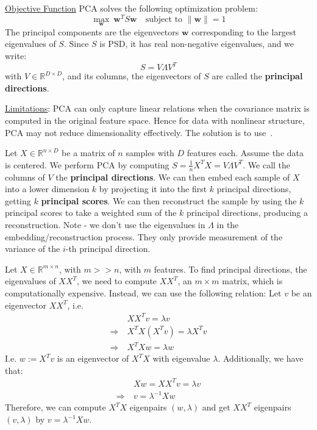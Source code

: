 \documentclass{article}
\begin{document}
\ul{Objective Function} PCA solves the following optimization problem:
\[
  \max_{\bm{w}} \ \bm{w}^{T} S \bm{w} \quad \text{subject to } \lVert \bm{w} \rVert =1
\]
The principal components are the eigenvectors $\bm{w}$ corresponding to the largest eigenvalues of $S$. Since $S$ is PSD, it has real non-negative eigenvalues, and we write:
\[
  S = V \Lambda V^{T}
\]
with $V \in \mathbb{R}^{D \times D}$, and its columns, the eigenvectors of $S$ are called the \textbf{principal directions}. 
 

\ul{Limitations}: PCA can only capture linear relations when the covariance matrix is computed in the original feature space. Hence for data with nonlinear structure, PCA may not reduce dimensionality effectively. The solution is to use~. 

\begin{remark}[Summary]
Let $X \in \mathbb{R}^{n \times D}$ be a matrix of $n$ samples with $D$ features each. Assume the data is centered. 
We perform PCA by computing $S = \frac{1}{n} X^{T} X = V \Lambda V^{T}$. 
We call the columns of $V$ the \textbf{principal directions}. 
We can then embed each sample of $X$ into a lower dimension $k$  by projecting it into the first $k$ principal directions, getting $k$ \textbf{principal scores}. 
We can then reconstruct the sample by using the $k$ principal scores to take a weighted sum of the $k$ principal directions, producing a reconstruction.
Note - we don't use the eigenvalues in $\Lambda$ in the embedding/reconstruction process. 
They only provide measurement of the variance of the $i$-th principal direction. 
\end{remark}

\begin{remark} Let $X \in \mathbb{R}^{m \times n}$, with $m >> n$, with $m$ features. To find principal directions, the eigenvalues of $X X^{T}$, we need to  compute $X X^{T}$, an $m \times m$ matrix, which is computationally expensive. Instead, we can use the following relation: Let $v$ be an eigenvector $X X ^{T}$, i.e.
\begin{align*}
  & XX^{T}v = \lambda v \\
  \Rightarrow \ & X^{T}X (X^{T}v) = \lambda X^{T}v \\
  \Rightarrow \ & X^{T} X w = \lambda w
\end{align*}
  I.e. $w := X^{T}v$  is an eigenvector of $X^{T}X$ with eigenvalue $\lambda$. Additionally, we have that:
\begin{align*}
  & X w = X X^{T}v = \lambda v \\
  \Rightarrow \ & v = \lambda ^{-1} X w
\end{align*}
  Therefore, we can compute $X^{T}X$ eigenpairs $(w, \lambda)$ and get $X X^{T}$ eigenpairs $(v, \lambda)$ by $v = \lambda ^{-1} X w$. 
\end{remark}
\end{document}
